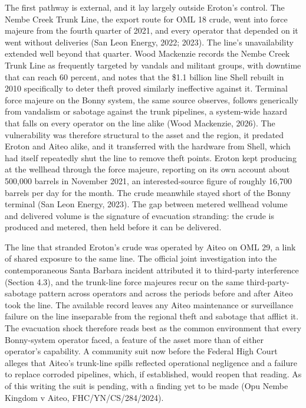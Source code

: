 The first pathway is external, and it lay largely outside Eroton's
control. The Nembe Creek Trunk Line, the export route for OML 18 crude,
went into force majeure from the fourth quarter of 2021, and every
operator that depended on it went without deliveries (San Leon Energy,
2022; 2023). The line's unavailability extended well beyond that
quarter. Wood Mackenzie records the Nembe Creek Trunk Line as frequently
targeted by vandals and militant groups, with downtime that can reach 60
percent, and notes that the \$1.1 billion line Shell rebuilt in 2010
specifically to deter theft proved similarly ineffective against it.
Terminal force majeure on the Bonny system, the same source observes,
follows generically from vandalism or sabotage against the trunk
pipelines, a system-wide hazard that falls on every operator on the line
alike (Wood Mackenzie, 2026). The vulnerability was therefore structural
to the asset and the region, it predated Eroton and Aiteo alike, and it
transferred with the hardware from Shell, which had itself repeatedly
shut the line to remove theft points. Eroton kept producing at the
wellhead through the force majeure, reporting on its own account about
500,000 barrels in November 2021, an interested-source figure of roughly
16,700 barrels per day for the month. The crude meanwhile stayed short
of the Bonny terminal (San Leon Energy, 2023). The gap between metered
wellhead volume and delivered volume is the signature of evacuation
stranding: the crude is produced and metered, then held before it can be
delivered.

The line that stranded Eroton's crude was operated by Aiteo on OML 29, a
link of shared exposure to the same line. The official joint
investigation into the contemporaneous Santa Barbara incident attributed
it to third-party interference (Section 4.3), and the trunk-line force
majeures recur on the same third-party-sabotage pattern across operators
and across the periods before and after Aiteo took the line. The
available record leaves any Aiteo maintenance or surveillance failure on
the line inseparable from the regional theft and sabotage that afflict
it. The evacuation shock therefore reads best as the common environment
that every Bonny-system operator faced, a feature of the asset more than
of either operator's capability. A community suit now before the Federal
High Court alleges that Aiteo's trunk-line spills reflected operational
negligence and a failure to replace corroded pipelines, which, if
established, would reopen that reading. As of this writing the suit is
pending, with a finding yet to be made (Opu Nembe Kingdom v Aiteo,
FHC/YN/CS/284/2024).

